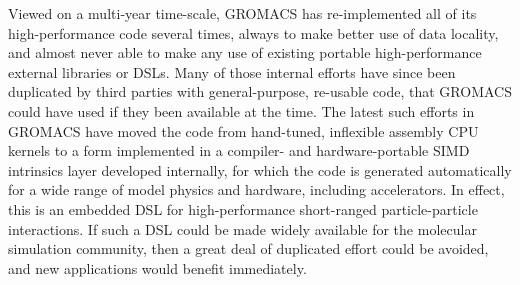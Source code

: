 Viewed on a multi-year time-scale, GROMACS has re-implemented
all of its high-performance code several times, always to make
better use of data locality,\cite{gromacs4,gromacs4.5,gromacs-exascale}
and almost never able to make any use of existing portable high-performance
external libraries or DSLs. Many of those internal efforts have since been
duplicated by third parties with general-purpose, re-usable code,
that GROMACS could have used if they been available at the time.
The latest such efforts in GROMACS have moved the code from
hand-tuned, inflexible assembly CPU kernels to a form implemented
in a compiler- and hardware-portable SIMD intrinsics layer developed
internally, for which the code is generated automatically for a wide
range of model physics and hardware, including accelerators.
In effect, this is an embedded DSL for high-performance short-ranged
particle-particle interactions. If such a DSL could be made widely
available for the molecular simulation community, then a great deal of
duplicated effort could be avoided, and new applications would
benefit immediately.

